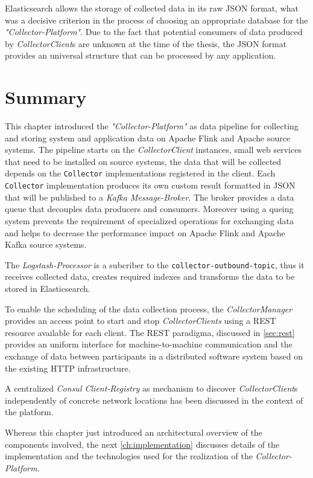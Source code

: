 Elasticsearch allows the storage of collected data in its raw JSON format, what was a decisive criterion in the process of choosing an
appropriate database for the \textit{"Collector-Platform"}. Due to the fact that potential consumers of data produced by \textit{CollectorClient}s
are unknown at the time of the thesis, the JSON format provides an universal structure that can be processed by any application.

\section{Summary}

This chapter introduced the \textit{"Collector-Platform"} as data pipeline for collecting and storing system and application data
on Apache Flink and Apache source systems. The pipeline starts on the \textit{CollectorClient} instances, small web services that need
to be installed on source systems, the data that will be collected depends on the \verb|Collector| implementations registered
in the client. Each \verb|Collector| implementation produces its own custom result formatted in JSON that will be published to a
\textit{Kafka Message-Broker}. The broker provides a data queue that decouples data producers and consumers. Moreover using
a queing system prevents the requirement of specialized operations for exchanging data and helps to decrease the performance impact on
Apache Flink and Apache Kafka source systems.

The \textit{Logstash-Processor} is a subcriber to the \verb|collector-outbound-topic|, thus it receives
collected data, creates required indexes and transforms the data to be stored in Elasticsearch.

To enable the scheduling of the data collection process, the \textit{CollectorManager} provides an access point to start and stop
\textit{CollectorClients} using a REST resource available for each client. The REST paradigma, discussed in \autoref{sec:rest} provides
an uniform interface for machine-to-machine communication and the exchange of data
between participants in a distributed software system based on the existing HTTP infrastructure.

A centralized \textit{Consul Client-Registry} as mechanism to discover \textit{CollectorClient}s independently of concrete network locations
has been discussed in the context of the platform.

Whereas this chapter just introduced an architectural overview of the components involved, the next \autoref{ch:implementation} discusses
details of the implementation and the technologies used for the realization of the \textit{Collector-Platform}.